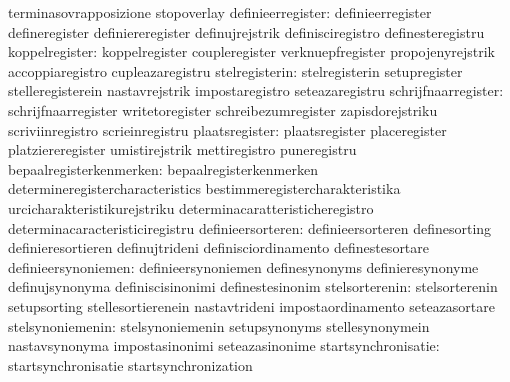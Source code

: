                                   terminasovrapposizione           stopoverlay
               definieerregister: definieerregister                defineregister
                                  definiereregister                definujrejstrik
                                  definisciregistro                definesteregistru
                  koppelregister: koppelregister                   coupleregister
                                  verknuepfregister                propojenyrejstrik
                                  accoppiaregistro                 cupleazaregistru
                  stelregisterin: stelregisterin                   setupregister
                                  stelleregisterein                nastavrejstrik
                                  impostaregistro                  seteazaregistru
             schrijfnaarregister: schrijfnaarregister              writetoregister
                                  schreibezumregister              zapisdorejstriku
                                  scriviinregistro                 scrieinregistru
                  plaatsregister: plaatsregister                   placeregister
                                  platziereregister                umistirejstrik
                                  mettiregistro                    puneregistru
         bepaalregisterkenmerken: bepaalregisterkenmerken          determineregistercharacteristics
                                  bestimmeregistercharakteristika  urcicharakteristikurejstriku
                                  determinacaratteristicheregistro determinacaracteristiciregistru
               definieersorteren: definieersorteren                definesorting
                                  definieresortieren               definujtrideni
                                  definisciordinamento             definestesortare
             definieersynoniemen: definieersynoniemen              definesynonyms
                                  definieresynonyme                definujsynonyma
                                  definiscisinonimi                definestesinonim
                  stelsorterenin: stelsorterenin                   setupsorting
                                  stellesortierenein               nastavtrideni
                                  impostaordinamento               seteazasortare
                stelsynoniemenin: stelsynoniemenin                 setupsynonyms
                                  stellesynonymein                 nastavsynonyma
                                  impostasinonimi                  seteazasinonime
             startsynchronisatie: startsynchronisatie              startsynchronization
